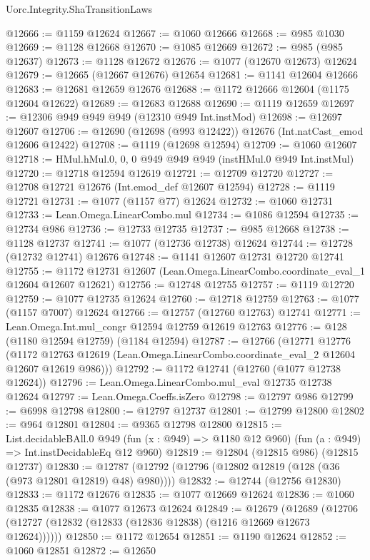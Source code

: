 \begin{lexlean}{Uorc.Integrity.ShaTransitionLaws}
\begin{coremodule}
@12666 := @1159 @12624
@12667 := @1060 @12666
@12668 := @985 @1030
@12669 := @1128 @12668
@12670 := @1085 @12669
@12672 := @985 (@985 @12637)
@12673 := @1128 @12672
@12676 := @1077 (@12670 @12673) @12624
@12679 := @12665 (@12667 @12676) @12654
@12681 := @1141 @12604 @12666
@12683 := @12681 @12659 @12676
@12688 := @1172 @12666 @12604 (@1175 @12604 @12622)
@12689 := @12683 @12688
@12690 := @1119 @12659
@12697 := @12306 @949 @949 @949 (@12310 @949 Int.instMod)
@12698 := @12697 @12607
@12706 := @12690 (@12698 (@993 @12422)) @12676 (Int.natCast_emod @12606 @12422)
@12708 := @1119 (@12698 @12594)
@12709 := @1060 @12607
@12718 := HMul.hMul.{0, 0, 0} @949 @949 @949 (instHMul.{0} @949 Int.instMul)
@12720 := @12718 @12594 @12619
@12721 := @12709 @12720
@12727 := @12708 @12721 @12676 (Int.emod_def @12607 @12594)
@12728 := @1119 @12721
@12731 := @1077 (@1157 @77) @12624
@12732 := @1060 @12731
@12733 := Lean.Omega.LinearCombo.mul
@12734 := @1086 @12594
@12735 := @12734 @986
@12736 := @12733 @12735
@12737 := @985 @12668
@12738 := @1128 @12737
@12741 := @1077 (@12736 @12738) @12624
@12744 := @12728 (@12732 @12741) @12676
@12748 := @1141 @12607 @12731 @12720 @12741
@12755 := @1172 @12731 @12607 (Lean.Omega.LinearCombo.coordinate_eval_1 @12604 @12607 @12621)
@12756 := @12748 @12755
@12757 := @1119 @12720
@12759 := @1077 @12735 @12624
@12760 := @12718 @12759
@12763 := @1077 (@1157 @7007) @12624
@12766 := @12757 (@12760 @12763) @12741
@12771 := Lean.Omega.Int.mul_congr @12594 @12759 @12619 @12763
@12776 := @128 (@1180 @12594 @12759) (@1184 @12594)
@12787 := @12766
    (@12771
      @12776
      (@1172 @12763 @12619 (Lean.Omega.LinearCombo.coordinate_eval_2 @12604 @12607 @12619 @986)))
@12792 := @1172 @12741 (@12760 (@1077 @12738 @12624))
@12796 := Lean.Omega.LinearCombo.mul_eval @12735 @12738 @12624
@12797 := Lean.Omega.Coeffs.isZero
@12798 := @12797 @986
@12799 := @6998 @12798
@12800 := @12797 @12737
@12801 := @12799 @12800
@12802 := @964 @12801
@12804 := @9365 @12798 @12800
@12815 := List.decidableBAll.{0}
    @949
    (fun (x : @949) => @1180 @12 @960)
    (fun (a : @949) => Int.instDecidableEq @12 @960)
@12819 := @12804 (@12815 @986) (@12815 @12737)
@12830 := @12787 (@12792 (@12796 (@12802 @12819 (@128 (@36 (@973 @12801 @12819) @48) @980))))
@12832 := @12744 (@12756 @12830)
@12833 := @1172 @12676
@12835 := @1077 @12669 @12624
@12836 := @1060 @12835
@12838 := @1077 @12673 @12624
@12849 := @12679
    (@12689 (@12706 (@12727 (@12832 (@12833 (@12836 @12838) (@1216 @12669 @12673 @12624))))))
@12850 := @1172 @12654
@12851 := @1190 @12624
@12852 := @1060 @12851
@12872 := @12650

\end{coremodule}
\end{lexlean}
